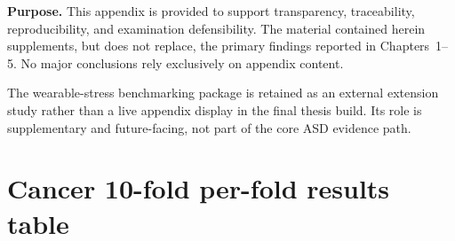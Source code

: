 \noindent\textbf{Purpose.} This appendix is provided to support transparency, traceability, reproducibility, and examination defensibility. The material contained herein supplements, but does not replace, the primary findings reported in Chapters~1--5. No major conclusions rely exclusively on appendix content.

\label{sec:appendix_ch4_s1}

\noindent The wearable-stress benchmarking package is retained as an external extension study rather than a live appendix display in the final thesis build. Its role is supplementary and future-facing, not part of the core ASD evidence path.

\label{tab:wearable_stress_benchmarks}
\label{tab:multimodal_fusion_comparison}
\label{fig:multimodal_fusion_bars}


\section{Cancer 10-fold per-fold results table}
\label{sec:appendix_ch4_s2}


